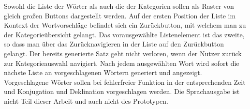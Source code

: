         Sowohl die Liste der Wörter als auch die der Kategorien sollen als Raster von gleich großen Buttons dargestellt werden. Auf der ersten Position der Liste im Kontext der Wortvorschläge befindet sich ein Zurückbutton, mit welchem man zu der Kategorieübersicht gelangt. Das vorausgewählte Listenelement ist das zweite, so dass  man über das Zurücknavigieren in der Liste auf den Zurückbutton gelangt. Der bereits generierte Satz geht nicht verloren, wenn der Nutzer zurück zur Kategorieauswahl navigiert. Nach jedem ausgewählten Wort wird sofort die nächste Liste an vorgeschlagenen Wörtern generiert und angezeigt. Vorgeschlagene Wörter sollen bei fehlerfreier Funktion in der entsprechenden Zeit und Konjugation und Deklination vorgeschlagen werden. Die Sprachausgabe ist nicht Teil dieser Arbeit und auch nicht des Prototypen.
        
	\newpage

    
    
    
    
    
    
    
    
    
    
    
    
    
    
    
    
    
    
    
    